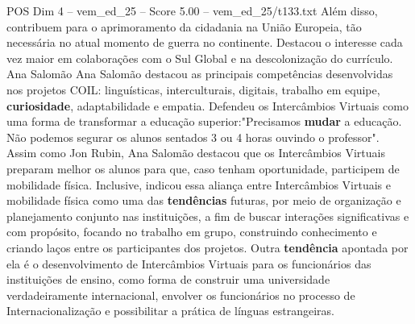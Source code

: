 \begin{textsample}{POS Dim 4 – vem\_ed\_25 – Score 5.00 – vem\_ed\_25/t133.txt}
Além disso, contribuem para o aprimoramento da cidadania na União Europeia, tão necessária no atual momento de guerra no continente.
Destacou o interesse cada vez maior em colaborações com o Sul Global e na descolonização do currículo.
Ana Salomão Ana Salomão destacou as principais competências desenvolvidas nos projetos COIL: linguísticas, interculturais, digitais, trabalho em equipe, \textbf{curiosidade}, adaptabilidade e empatia.
Defendeu os Intercâmbios Virtuais como uma forma de transformar a educação superior:"Precisamos \textbf{mudar} a educação.
Não podemos segurar os alunos sentados 3 ou 4 horas ouvindo o professor".
Assim como Jon Rubin, Ana Salomão destacou que os Intercâmbios Virtuais preparam melhor os alunos para que, caso tenham oportunidade, participem de mobilidade física.
Inclusive, indicou essa aliança entre Intercâmbios Virtuais e mobilidade física como uma das \textbf{tendências} futuras, por meio de organização e planejamento conjunto nas instituições, a fim de buscar interações significativas e com propósito, focando no trabalho em grupo, construindo conhecimento e criando laços entre os participantes dos projetos.
Outra \textbf{tendência} apontada por ela é o desenvolvimento de Intercâmbios Virtuais para os funcionários das instituições de ensino, como forma de construir uma universidade verdadeiramente internacional, envolver os funcionários no processo de Internacionalização e possibilitar a prática de línguas estrangeiras.

\end{textsample}
